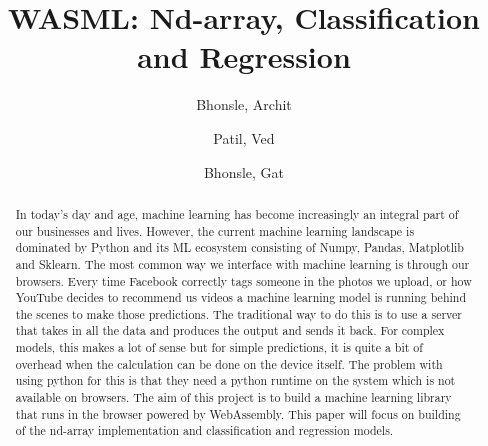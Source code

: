 \documentclass[a4paper,12pt]{report}
\title{WASML: Nd-array, Classification and Regression}
\author{
  Bhonsle, Archit\\
  \and
  Patil, Ved\\
  \and
  Bhonsle, Gat\\
}
\begin{document}
\maketitle
\tableofcontents

\begin{abstract}
  In today’s day and age, machine learning has become increasingly an
  integral part of our businesses and lives. However, the current machine
  learning landscape is dominated by Python and its ML ecosystem consisting
  of Numpy, Pandas, Matplotlib and Sklearn. The most common way we
  interface with machine learning is through our browsers. Every time
  Facebook correctly tags someone in the photos we upload, or how YouTube
  decides to recommend us videos a machine learning model is running behind
  the scenes to make those predictions. The traditional way to do this is
  to use a server that takes in all the data and produces the output and
  sends it back. For complex models, this makes a lot of sense but for
  simple predictions, it is quite a bit of overhead when the calculation
  can be done on the device itself. The problem with using python for this
  is that they need a python runtime on the system which is not available
  on browsers. The aim of this project is to build a machine learning
  library that runs in the browser powered by WebAssembly. This paper will
  focus on building of the nd-array implementation and classification and
  regression models.
\end{abstract}
\end{document}
